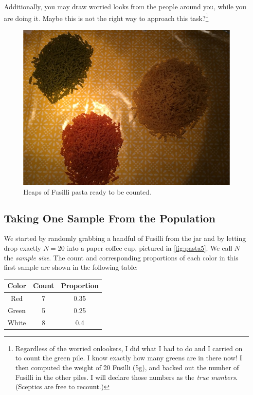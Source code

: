 \documentclass[]{book}
\begin{document}
Additionally, you may draw worried looks from the people around you, while you are doing it. Maybe this is not the right way to approach this task?\footnote{Regardless of the worried onlookers, I did what I had to do and I carried on to count the green pile. I know exactly how many greens are in there now! I then computed the weight of 20 Fusilli (5g), and backed out the number of Fusilli in the other piles. I will declare those numbers as the \emph{true numbers}. (Sceptics are free to recount.)}

\begin{figure}

{\centering \includegraphics[width=0.9\linewidth]{images/pasta3} 

}

\caption{Heaps of Fusilli pasta ready to be counted.}\label{fig:pasta3}
\end{figure}

\hypertarget{taking-one-sample-from-the-population}{%
\subsection{Taking One Sample From the Population}\label{taking-one-sample-from-the-population}}

We started by randomly grabbing a handful of Fusilli from the jar and by letting drop exactly \(N=20\) into a paper coffee cup, pictured in \ref{fig:pasta5}. We call \(N\) the \emph{sample size}. The count and corresponding proportions of each color in this first sample are shown in the following table:

\begin{longtable}[]{@{}ccc@{}}
\toprule
Color & Count & Proportion\tabularnewline
\midrule
\endhead
Red & 7 & 0.35\tabularnewline
Green & 5 & 0.25\tabularnewline
White & 8 & 0.4\tabularnewline
\bottomrule
\end{longtable}
\end{document}

